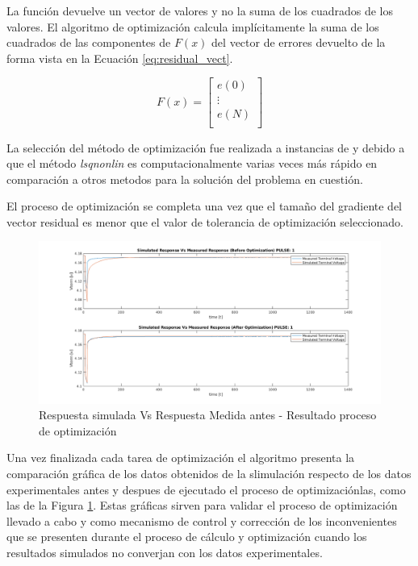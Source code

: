 \documentclass[10pt, a4paper]{article}
\begin{document}
La función devuelve un vector de valores y no la suma de los cuadrados de los
valores. El algoritmo de optimización calcula implícitamente la suma de los
cuadrados de las componentes de $F(x)$ del vector de errores devuelto de la
forma vista en la Ecuación \ref{eq:residual_vect}.

\begin{equation}
    F(x) = \begin{bmatrix}
        e(0)\\
        \vdots\\
        e(N)\\
    \end{bmatrix}
    \label{eq:residual_vect}
\end{equation}

La selección del método de optimización fue realizada a instancias de
\cite{Jackey2013BatteryMP} y debido a que el método \emph{lsqnonlin} es
computacionalmente varias veces más rápido en comparación a otros metodos para
la solución del problema en cuestión.

El proceso de optimización se completa una vez que el tamaño del gradiente del
vector residual es menor que el valor de tolerancia de optimización
seleccionado.

\begin{figure}[h!]
	\begin{center}
		\includegraphics[width=1\textwidth]{sim_vs_measured_response.png}
		\caption{Respuesta simulada Vs Respuesta Medida antes - Resultado
        proceso de optimización}
		\label{fig:sim_vs_mea_resp}
	\end{center}
\end{figure}

Una vez finalizada cada tarea de optimización el algoritmo presenta la comparación gráfica de los
datos obtenidos de la slimulación respecto de los datos experimentales antes y
despues de ejecutado el proceso de optimizaciónlas, como
las de la Figura \ref{fig:sim_vs_mea_resp}. Estas gráficas sirven para
validar el proceso de optimización llevado a cabo y como mecanismo de control y
corrección de los inconvenientes que se presenten durante el proceso de cálculo
y optimización cuando los resultados simulados no converjan con los datos
experimentales.
\end{document}
